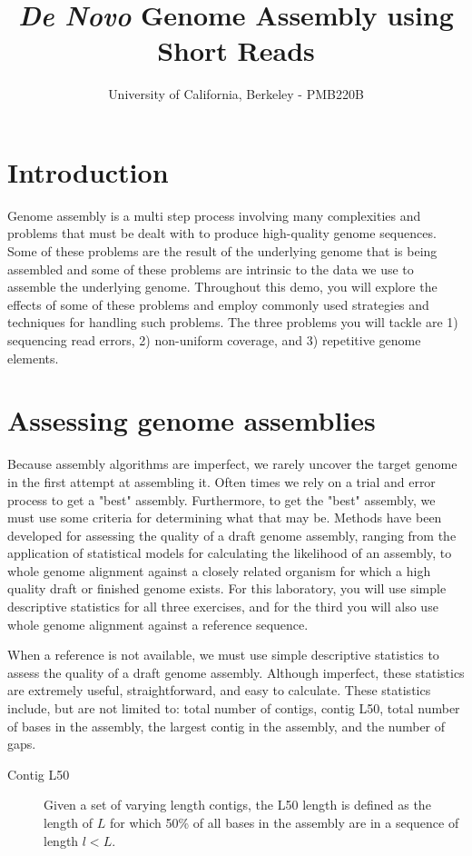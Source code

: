 \documentclass[11pt,a4paper]{scrartcl}
\title{\emph{De Novo} Genome Assembly using Short Reads}
\subtitle{University of California, Berkeley - PMB220B}
\author{}
\date{}
\begin{document}
  \maketitle

\section*{Introduction}
Genome assembly is a multi step process involving many complexities and
problems that must be dealt with to produce high-quality genome sequences. Some
of these problems are the result of the underlying genome that is being
assembled and some of these problems are intrinsic to the data we use to
assemble the underlying genome. Throughout this demo, you will explore the
effects of some of these problems and employ commonly used strategies and
techniques for handling such problems. The three problems you will tackle are
1) sequencing read errors, 2) non-uniform coverage, and 3) repetitive genome
elements. 

\section*{Assessing genome assemblies}
Because assembly algorithms are imperfect, we rarely uncover the target genome
in the first attempt at assembling it. Often times we rely on a trial and error
process to get a "best" assembly. Furthermore, to get the "best" assembly, we
must use some criteria for determining what that may be. Methods have been
developed for assessing the quality of a draft genome assembly, ranging from
the application of statistical models for calculating the likelihood of an
assembly, to whole genome alignment against a closely related organism for
which a high quality draft or finished genome exists. For this laboratory, you
will use simple descriptive statistics for all three exercises, and for the
third you will also use whole genome alignment against a reference sequence. 

When a reference is not available, we must use simple descriptive statistics to
assess the quality of a draft genome assembly. Although imperfect, these
statistics are extremely useful, straightforward, and easy to calculate. These
statistics include, but are not limited to: total number of contigs, contig
L50, total number of bases in the assembly, the largest contig in the assembly,
and the number of gaps.
\begin{description}
    \item[Contig L50] Given a set of varying length contigs, the L50 length is
                      defined as the length of $L$ for which 50\% of all bases in the assembly are in a
                      sequence of length $l < L$.
\end{description}
\end{document}
